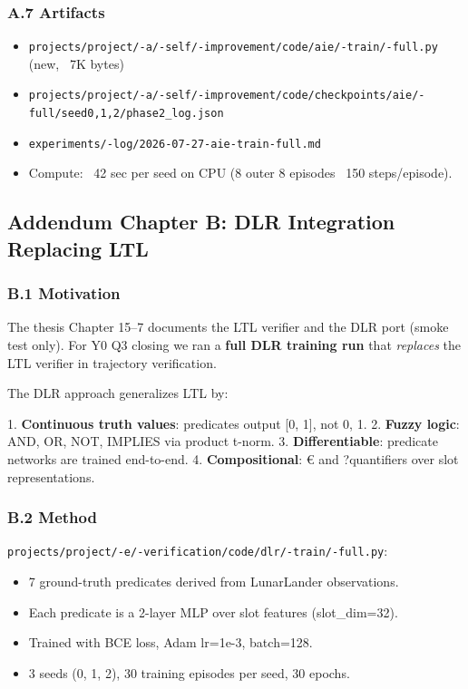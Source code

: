 \documentclass[11pt]{article}
\begin{document}
\subsubsection{A.7 Artifacts}

\begin{itemize}
  \item \texttt{projects/project/-a/-self/-improvement/code/aie/-train/-full.py} (new, ~7K bytes)
  \item \texttt{projects/project/-a/-self/-improvement/code/checkpoints/aie/-full/seed{0,1,2}/phase2\_log.json}
  \item \texttt{experiments/-log/2026-07-27-aie-train-full.md}
  \item Compute: ~42 sec per seed on CPU (8 outer  8 episodes  ~150 steps/episode).
\end{itemize}


\hrulefill

\subsection{Addendum Chapter B: DLR Integration Replacing LTL}

\subsubsection{B.1 Motivation}

The thesis Chapter 15--7 documents the LTL verifier and the DLR port (smoke
test only). For Y0 Q3 closing we ran a \textbf{full DLR training run} that
\textit{replaces} the LTL verifier in trajectory verification.

The DLR approach generalizes LTL by:

1. \textbf{Continuous truth values}: predicates output [0, 1], not {0, 1}.
2. \textbf{Fuzzy logic}: AND, OR, NOT, IMPLIES via product t-norm.
3. \textbf{Differentiable}: predicate networks are trained end-to-end.
4. \textbf{Compositional}: € and ?quantifiers over slot representations.

\subsubsection{B.2 Method}

\texttt{projects/project/-e/-verification/code/dlr/-train/-full.py}:

\begin{itemize}
  \item 7 ground-truth predicates derived from LunarLander observations.
  \item Each predicate is a 2-layer MLP over slot features (slot\_dim=32).
  \item Trained with BCE loss, Adam lr=1e-3, batch=128.
  \item 3 seeds (0, 1, 2), 30 training episodes per seed, 30 epochs.
\end{itemize}
\end{document}
